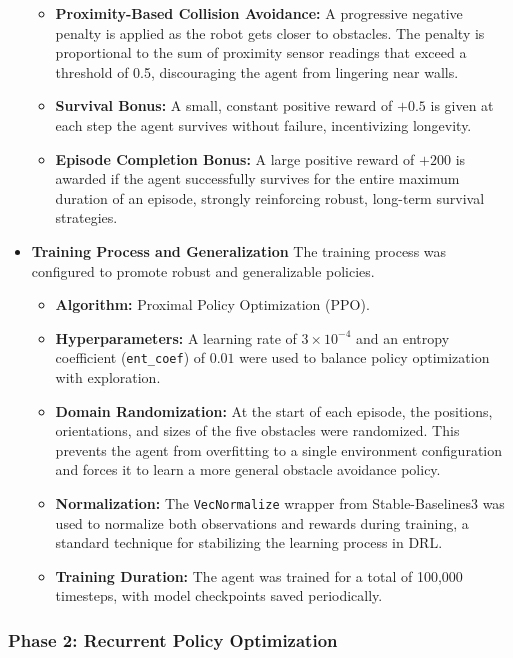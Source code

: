 \documentclass[final,5p,times,twocolumn,authoryear]{elsarticle}
\begin{document}
\begin{itemize}
\begin{itemize}
            \item \textbf{Proximity-Based Collision Avoidance:} A progressive negative penalty is applied as the robot gets closer to obstacles. The penalty is proportional to the sum of proximity sensor readings that exceed a threshold of 0.5, discouraging the agent from lingering near walls.
            \item \textbf{Survival Bonus:} A small, constant positive reward of \(+0.5\) is given at each step the agent survives without failure, incentivizing longevity.
            \item \textbf{Episode Completion Bonus:} A large positive reward of \(+200\) is awarded if the agent successfully survives for the entire maximum duration of an episode, strongly reinforcing robust, long-term survival strategies.
        \end{itemize}
    \item \textbf{Training Process and Generalization}
        The training process was configured to promote robust and generalizable policies.
        \begin{itemize}
            \item \textbf{Algorithm:} Proximal Policy Optimization (PPO).
            \item \textbf{Hyperparameters:} A learning rate of \(3 \times 10^{-4}\) and an entropy coefficient (\texttt{ent\_coef}) of \(0.01\) were used to balance policy optimization with exploration.
            \item \textbf{Domain Randomization:} At the start of each episode, the positions, orientations, and sizes of the five obstacles were randomized. This prevents the agent from overfitting to a single environment configuration and forces it to learn a more general obstacle avoidance policy.
            \item \textbf{Normalization:} The \texttt{VecNormalize} wrapper from Stable-Baselines3 was used to normalize both observations and rewards during training, a standard technique for stabilizing the learning process in DRL.
            \item \textbf{Training Duration:} The agent was trained for a total of 100,000 timesteps, with model checkpoints saved periodically.
        \end{itemize}
\end{itemize}

\subsubsection{Phase 2: Recurrent Policy Optimization}
\end{document}
